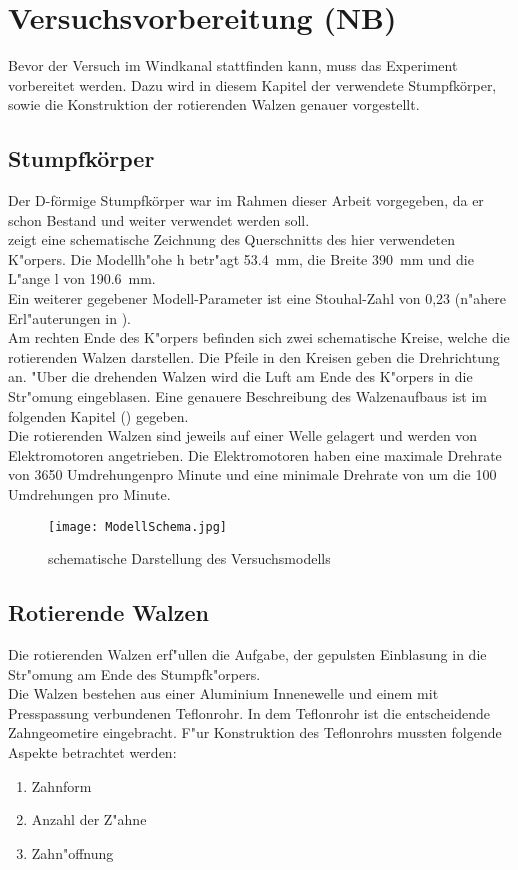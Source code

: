 \chapter{Versuchsvorbereitung (NB)}
\label{s:versuchsvorbereitung}
Bevor der Versuch im Windkanal stattfinden kann, muss das Experiment vorbereitet werden. Dazu wird in diesem Kapitel der verwendete Stumpfk\"orper, sowie die Konstruktion der rotierenden Walzen genauer vorgestellt.
\section{Stumpfk\"orper}
Der D-f\"ormige Stumpfk\"orper war im Rahmen dieser Arbeit vorgegeben, da er schon Bestand und weiter verwendet werden soll.\\
 zeigt eine schematische Zeichnung des Querschnitts des hier verwendeten K"orpers. Die Modellh"ohe h betr"agt \SI{53,4}{\milli\meter}, die Breite \SI{390}{\milli\meter} und die L"ange l von \SI{190,6}{\milli\meter}.\\
Ein weiterer gegebener Modell-Parameter ist eine Stouhal-Zahl von 0,23 (n"ahere Erl"auterungen in ).\\
Am rechten Ende des K"orpers befinden sich zwei schematische Kreise, welche die rotierenden Walzen darstellen. Die Pfeile in den Kreisen geben die Drehrichtung an. "Uber die drehenden Walzen wird die Luft am Ende des K"orpers in die Str"omung eingeblasen. Eine genauere Beschreibung des Walzenaufbaus ist im folgenden Kapitel () gegeben.\\
Die rotierenden Walzen sind jeweils auf einer Welle gelagert und werden von Elektromotoren angetrieben. Die Elektromotoren haben eine maximale Drehrate von 3650 Umdrehungenpro Minute und eine minimale Drehrate von um die 100 Umdrehungen pro Minute.
\begin{figure}[h]
	\centering
	\texttt{[image: ModellSchema.jpg]}
	\caption{schematische Darstellung des Versuchsmodells}
	\label{fig:modelschema}
\end{figure}

\section{Rotierende Walzen}
\label{rotierendeWalze}
Die rotierenden Walzen erf"ullen die Aufgabe, der gepulsten Einblasung in die Str"omung am Ende des Stumpfk"orpers.\\
Die Walzen bestehen aus einer Aluminium Innenewelle und einem mit Presspassung verbundenen Teflonrohr. In dem Teflonrohr ist die entscheidende Zahngeometire eingebracht. F"ur Konstruktion des Teflonrohrs mussten folgende Aspekte betrachtet werden:
\begin{enumerate}
	\item Zahnform 
	\item Anzahl der Z"ahne
	\item Zahn"offnung 
\end{enumerate}

